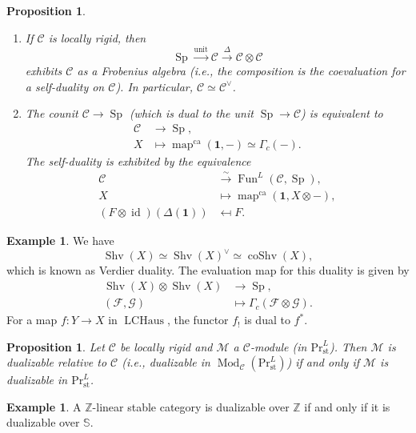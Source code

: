 \documentclass[draft]{amsart}
\newcommand{\ZZ}{\mathbb{Z}}
\renewcommand{\SS}{\mathbb{S}}
\newcommand{\cat}[1]{\mathcal{#1}}
\newcommand{\sheaf}[1]{\mathcal{#1}}
\newcommand{\isoto}{\mathbin{\xrightarrow{\sim}}}
\renewcommand{\Pr}{\mathrm{Pr}}
\newcommand{\one}{\mathbf{1}}
\newcommand{\blank}{-} %
\DeclareMathOperator{\LCHaus}{LCHaus}
\DeclareMathOperator{\id}{id}
\DeclareMathOperator{\coShv}{coShv}
\DeclareMathOperator{\map}{map}
\DeclareMathOperator{\Shv}{Shv}
\DeclareMathOperator{\Sp}{Sp}
\DeclareMathOperator{\Fun}{Fun}
\DeclareMathOperator{\Mod}{Mod}
\newtheorem{prop}[thm]{Proposition}
\theoremstyle{definition}
\newtheorem{ex}[thm]{Example}
\begin{document}
\begin{prop}
\begin{enumerate}[(1)]
\item If $\cat C$ is locally rigid, then
\[
\Sp \xrightarrow{\mathrm{unit}} \cat C \xrightarrow{\Delta} \cat C\otimes \cat C
\]
exhibits $\cat C$ as a Frobenius algebra (i.e., the composition is the coevaluation for a self-duality on $\cat C$). In particular, $\cat C \simeq \cat C^\vee$.

\item The counit $\cat C\to \Sp$ (which is dual to the unit $\Sp \to \cat C$) is equivalent to 
\begin{align*}
\cat C &\to \Sp, \\
X &\mapsto \map^{\mathrm{ca}}(\one,\blank) \simeq \Gamma_c(\blank).
\end{align*}
The self-duality is exhibited by the equivalence
\begin{align*}
\cat C &\isoto \Fun^L(\cat C, \Sp), \\
X &\mapsto \map^{\mathrm{ca}}(\one, X\otimes\blank), \\
(F\otimes \id)(\Delta(\one)) &\mapsfrom F.
\end{align*}
\end{enumerate}
\end{prop}

\begin{ex}
We have 
\[
\Shv(X) \simeq \Shv(X)^\vee \simeq \coShv(X),
\]
which is known as Verdier duality. The evaluation map for this duality is given by
\begin{align*}
\Shv(X) \otimes \Shv(X) &\to \Sp, \\
(\sheaf F, \sheaf G) &\mapsto \Gamma_c(\sheaf F\otimes \sheaf G).
\end{align*}
For a map $f\colon Y\to X$ in $\LCHaus$, the functor $f_!$ is dual to $f^*$.
\end{ex}

\begin{prop}
Let $\cat C$ be locally rigid and $\cat M$ a $\cat C$-module (in $\Pr^L_{\mathrm{st}}$). Then $\cat M$ is dualizable relative to $\cat C$ (i.e., dualizable in $\Mod_{\cat C}(\Pr^L_{\mathrm{st}})$) if and only if $\cat M$ is dualizable in $\Pr^L_{\mathrm{st}}$.
\end{prop}

\begin{ex}
A $\ZZ$-linear stable category is dualizable over $\ZZ$ if and only if it is dualizable over $\SS$.
\end{ex}
\end{document}
